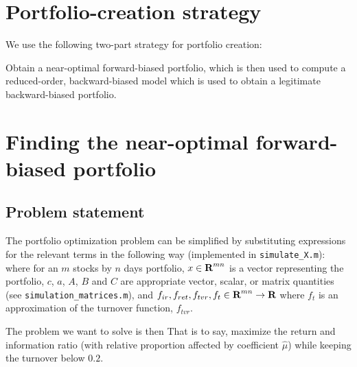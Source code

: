 \documentclass{article}
\begin{document}
 \clearpage


\section{Portfolio-creation strategy}

    We use the following two-part strategy for portfolio creation:
    \begin{enumerate}
        \I  Obtain a near-optimal forward-biased portfolio, which is then used to
        \I  compute a reduced-order, backward-biased model which is used
            to obtain a legitimate backward-biased portfolio.
    \end{enumerate}
            



\section{Finding the near-optimal forward-biased portfolio}

\subsection{Problem statement}
    The portfolio optimization problem can be simplified 
        by substituting expressions for the relevant terms in the following way
        (implemented in \verb+simulate_X.m+):
    where for an $m$ stocks by $n$ days portfolio,
        \BI $x \in {\mbox{\bf R}}^{mn}$ is a vector representing the portfolio,
        \I  $c$, $a$, $A$, $B$ and $C$ are appropriate vector, scalar, 
            or matrix quantities (see \verb+simulation_matrices.m+), and
        \I  $f_{ir}, f_{ret}, f_{tvr}, f_{t} \in {\mbox{\bf R}}^{mn} \to {\mbox{\bf R}}$
            where $f_{t}$ is an approximation of the turnover function, 
            $f_{tvr}$. \EI

    The problem we want to solve is then
    That is to say, maximize the return and information ratio
        (with relative proportion affected by coefficient $\hat{\mu}$)
        while keeping the turnover below $0.2$.
\end{document}
